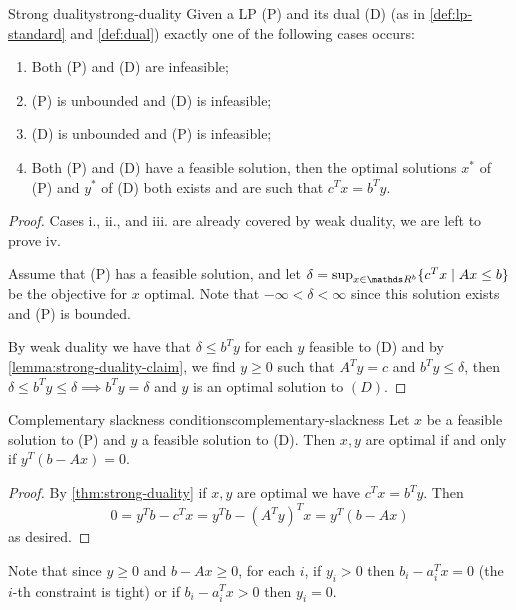 \documentclass[12pt]{extarticle}
\begin{document}
\begin{theorem}{Strong duality}{strong-duality}
	Given a LP (P) and its dual (D) (as in \cref{def:lp-standard} and \cref{def:dual})
	exactly one of the following cases occurs:
	\begin{enumerate}[label=\roman*.]
		\item Both (P) and (D) are infeasible;
		\item (P) is unbounded and (D) is infeasible;
		\item (D) is unbounded and (P) is infeasible;
		\item Both (P) and (D) have a feasible solution, then the optimal solutions $x^*$ of (P)
		      and $y^*$ of (D) both exists and are such that $c^T x = b^T y$.
	\end{enumerate}
\end{theorem}

\begin{proof}
	Cases i., ii., and iii. are already covered by weak duality, we are left to prove iv.

	Assume that (P) has a feasible solution, and let
	$\delta = \sup_{x \in \R^b} \{c^T x \mid Ax \leq b\}$ be the objective for $x$ optimal.
	Note that $-\infty < \delta < \infty$ since this solution exists and (P) is bounded.

	By weak duality we have that $\delta \leq b^T y$ for each $y$ feasible to (D)
	and by \cref{lemma:strong-duality-claim}, we find $y \geq 0$ such that $A^T y = c$ and
	$b^T y \leq \delta$, then $\delta \leq b^T y \leq \delta \implies b^T y = \delta$ and $y$ is an
	optimal solution to $(D)$.
\end{proof}

\begin{theorem}{Complementary slackness conditions}{complementary-slackness}
	Let $x$ be a feasible solution to (P) and $y$ a feasible solution to (D).
	Then $x,y$ are optimal if and only if $y^T(b-Ax) = 0$.
\end{theorem}

\begin{proof}
	By \cref{thm:strong-duality} if $x, y$ are optimal we have $c^T x = b^T y$.
	Then
	\begin{equation}
		0 = y^T b - c^T x = y^T b - (A^T y)^T x = y^T (b - Ax)
	\end{equation}
	as desired.
\end{proof}

Note that since $y \geq 0$ and $b - Ax \geq 0$, for each $i$, if $y_i > 0$ then $b_i-a_i^T x = 0$
(the $i$-th constraint is tight) or if $b_i-a_i^T x > 0$ then $y_i = 0$.
\end{document}
